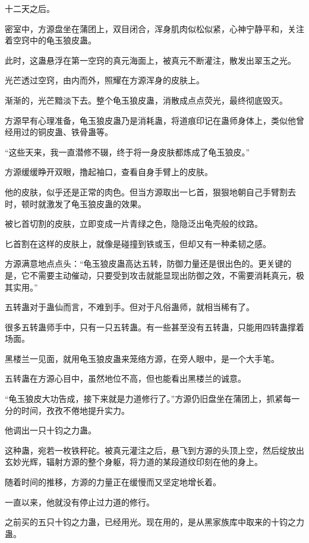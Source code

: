 
\begin{this_body}

十二天之后。

密室中，方源盘坐在蒲团上，双目闭合，浑身肌肉似松似紧，心神宁静平和，关注着空窍中的龟玉狼皮蛊。

此时，这蛊悬浮在第一空窍的真元海面上，被真元不断灌注，散发出翠玉之光。

光芒透过空窍，由内而外，照耀在方源浑身的皮肤上。

渐渐的，光芒黯淡下去。整个龟玉狼皮蛊，消散成点点荧光，最终彻底毁灭。

方源早有心理准备，龟玉狼皮蛊乃是消耗蛊，将道痕印记在蛊师身体上，类似他曾经用过的铜皮蛊、铁骨蛊等。

“这些天来，我一直潜修不辍，终于将一身皮肤都炼成了龟玉狼皮。”

方源缓缓睁开双眼，撸起袖口，查看自身手臂上的皮肤。

他的皮肤，似乎还是正常的肉色。但当方源取出一匕首，狠狠地朝自己手臂割去时，顿时就激发了龟玉狼皮蛊的效果。

被匕首切割的皮肤，立即变成一片青绿之色，隐隐泛出龟壳般的纹路。

匕首割在这样的皮肤上，就像是碰撞到铁或玉，但却又有一种柔韧之感。

方源满意地点点头：“龟玉狼皮蛊高达五转，防御力量还是很出色的。更关键的是，它不需要主动催动，只要受到攻击就能显现出防御之效，不需要消耗真元，极其实用。”

五转蛊对于蛊仙而言，不难到手。但对于凡俗蛊师，就相当稀有了。

很多五转蛊师手中，只有一只五转蛊。有一些甚至没有五转蛊，只能用四转蛊撑着场面。

黑楼兰一见面，就用龟玉狼皮蛊来笼络方源，在旁人眼中，是一个大手笔。

五转蛊在方源心目中，虽然地位不高，但也能看出黑楼兰的诚意。

“龟玉狼皮大功告成，接下来就是力道修行了。”方源仍旧盘坐在蒲团上，抓紧每一分的时间，孜孜不倦地提升实力。

他调出一只十钧之力蛊。

这种蛊，宛若一枚铁秤砣。被真元灌注之后，悬飞到方源的头顶上空，然后绽放出玄妙光辉，辐射方源的整个身躯，将力道的某段道纹印刻在他的身上。

随着时间的推移，方源的力量正在缓慢而又坚定地增长着。

一直以来，他就没有停止过力道的修行。

之前买的五只十钧之力蛊，已经用光。现在用的，是从黑家族库中取来的十钧之力蛊。


\end{this_body}
